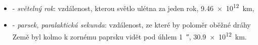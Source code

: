 \begin{itemize}
\begin{itemize}
          \item Velikost viditelného vesmíru je asi \qty{8.66e14}{\AU}.
        \end{itemize}
      \item \textbf{\unit{\lightyear}} - \emph{světelný rok}: vzdálenost, kterou světlo ulétna za    
            jeden rok, \qty{9.46e12}{\km},
      \item \textbf{\unit{\parsec}} - \emph{parsek, paralaktická sekunda}: vzdálenost, ze které by  
            poloměr oběžné dráhy Země byl kolmo k zornému paprsku vidět pod úhlem 
            \qty{1}{\arcsecond}, 
            \qty{30.9e12}{\km}. 
    \end{itemize}